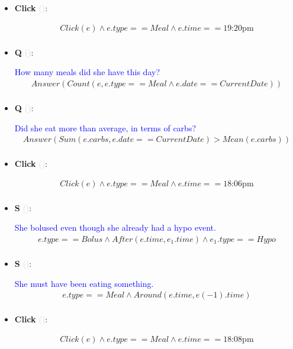 \documentclass[11pt]{article}
\newcounter{CQ}
\newcounter{CS}
\newcounter{CClick}
\newcommand{\key}[1]{\textcolor{lightgray}{#1}}
\begin{document}
\begin{itemize}
	\item
	\textbf{Click\theCClick} \key{()}: \addtocounter{CClick}{1}
	\begin{multline*}
	Click(e) \wedge e.type == Meal \wedge e.time == \mbox{19:20pm} \\
	\end{multline*}
	
	\item
	\textbf{Q\theCQ} \key{()}: \addtocounter{CQ}{1}
	\textcolor{blue}{ How many meals did she have this day? }
	\begin{multline*}
	Answer(Count(e, e.type==Meal \wedge e.date==CurrentDate))  \\
	\end{multline*}
	
	\item
	\textbf{Q\theCQ} \key{()}: \addtocounter{CQ}{1}
	\textcolor{blue}{ Did she eat more than average, in terms of carbs? }
	\begin{multline*}
	Answer(Sum(e.carbs, e.date==CurrentDate) > Mean(e.carbs))   \\
	\end{multline*}
	
	\item
	\textbf{Click\theCClick} \key{()}: \addtocounter{CClick}{1}
	\begin{multline*}
	Click(e) \wedge e.type == Meal \wedge e.time == \mbox{18:06pm} \\
	\end{multline*}
	
	
	\item
	\textbf{S\theCS} \key{()}: \addtocounter{CS}{1}
	\textcolor{blue}{ She bolused even though she already had a hypo event. }
	\begin{multline*}
	e.type==Bolus \wedge After(e.time, e_1.time) \wedge  e_1.type == Hypo \\
	\end{multline*}
	
	
	\item
	\textbf{S\theCS} \key{()}: \addtocounter{CS}{1}
	\textcolor{blue}{ She must have been eating something.}
	\begin{multline*}
	e.type == Meal \wedge Around(e.time, e(-1).time)   \\
	\end{multline*}
	
	\item
	\textbf{Click\theCClick} \key{()}: \addtocounter{CClick}{1}
	\begin{multline*}
	Click(e) \wedge e.type == Meal \wedge e.time == \mbox{18:08pm}  \\
	\end{multline*}
	

\end{itemize}
\end{document}
